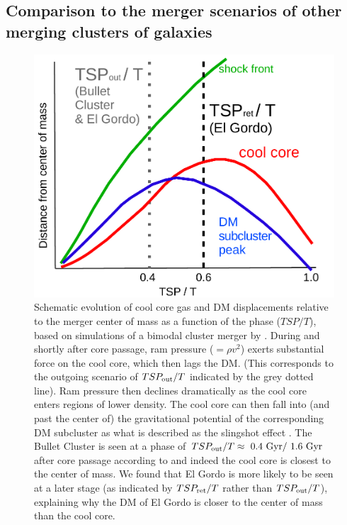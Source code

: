 \documentclass[letterpaper,useAMS,usenatbib]{mn2e}
\begin{document}
\subsection{Comparison to the merger scenarios of other merging clusters of galaxies}

\begin{figure}
	\includegraphics[width=\linewidth]{merger_scenario.pdf}
 \caption{Schematic evolution of cool core gas and DM displacements relative to the
merger center of mass as a function of the phase ($TSP / T$), based on
simulations of a bimodal cluster merger by \citet{Mathis05}. During and
shortly after core passage, ram pressure ($=\rho v^2$) exerts substantial
force on the cool core, which then lags the DM. (This corresponds to the
outgoing scenario of $TSP_{\rm out} / T$ indicated by the grey dotted line). Ram
pressure then declines dramatically as the cool core enters regions of
lower density.  The cool core can then fall into (and past the center of)
the gravitational potential of the corresponding DM subcluster as what is
described as the slingshot effect \citep{Markevitch2007}.  The Bullet
Cluster is seen at a phase of $TSP_{\rm out} / T \approx ~0.4\text{ Gyr} / ~1.6
\text{ Gyr}$ after core passage according
to  and indeed the cool core is closest to the center of
mass. We found that El Gordo is more likely to be seen at a later stage (as
indicated by $TSP_{\rm ret} / T$ rather than $TSP_{\rm out} / T$), explaining why the DM of
El Gordo is closer to the center of mass than the cool core. \label{fig:merger_scenario}}
\end{figure}
	
\end{document}
